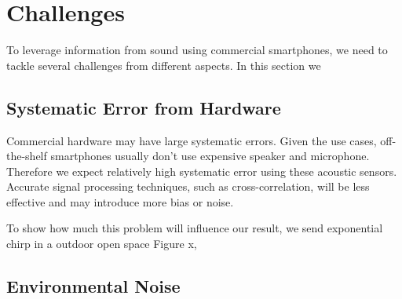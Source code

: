 \section{Challenges}
\label{sec:chall}

To leverage information from sound using commercial smartphones, we need to
tackle several challenges from different aspects. In this section we 


\subsection{Systematic Error from Hardware}
Commercial hardware may have large systematic errors. 
Given the use cases, off-the-shelf smartphones usually don't use expensive
speaker and microphone. Therefore we expect relatively high systematic error 
using these acoustic sensors. Accurate signal processing techniques, such as 
cross-correlation, will be less effective and may introduce more bias or noise.



To show how much this problem will influence our result, we send exponential chirp 
in a outdoor open space Figure x, 


\subsection{Environmental Noise}



% 
% 
% 
% 
% 
% 
